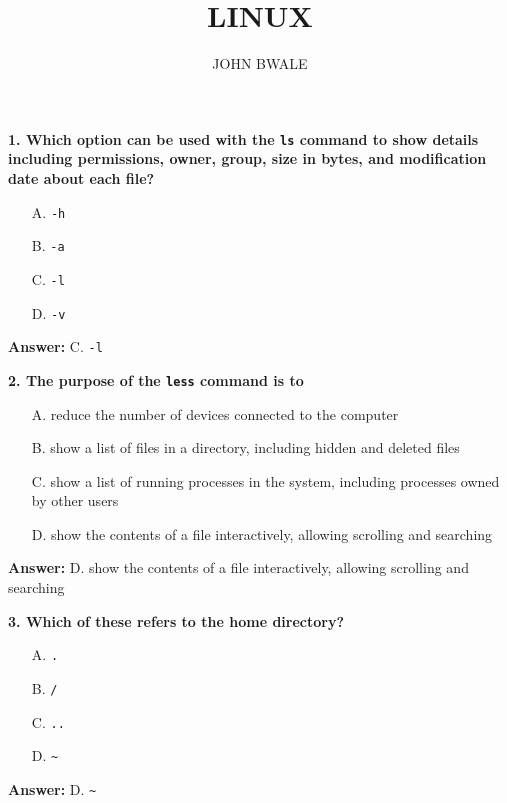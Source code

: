 \documentclass{article}
\title{LINUX}
\author{JOHN BWALE}
\begin{document}
\maketitle

\textbf{1. Which option can be used with the \texttt{ls} command to show details including permissions, owner, group, size in bytes, and modification date about each file?}

\begin{itemize}
  \item[A.] \texttt{-h}
  \item[B.] \texttt{-a}
  \item[C.] \texttt{-l}
  \item[D.] \texttt{-v}
\end{itemize}

\textbf{Answer:} C. \texttt{-l}

\vspace{0.5cm}

\textbf{2. The purpose of the \texttt{less} command is to}

\begin{itemize}
  \item[A.] reduce the number of devices connected to the computer
  \item[B.] show a list of files in a directory, including hidden and deleted files
  \item[C.] show a list of running processes in the system, including processes owned by other users
  \item[D.] show the contents of a file interactively, allowing scrolling and searching
\end{itemize}

\textbf{Answer:} D. show the contents of a file interactively, allowing scrolling and searching

\vspace{0.5cm}

\textbf{3. Which of these refers to the home directory?}

\begin{itemize}
  \item[A.] \texttt{.}
  \item[B.] \texttt{/}
  \item[C.] \texttt{..}
  \item[D.] \texttt{\~}
\end{itemize}

\textbf{Answer:} D. \texttt{\~}

\vspace{0.5cm}
\end{document}
